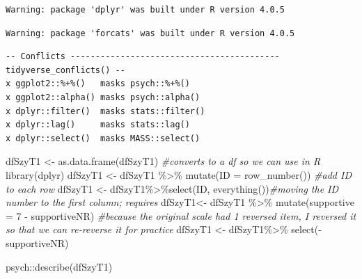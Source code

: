 \documentclass[
  english,
]{book}
\newenvironment{Shaded}{\begin{snugshade}}{\end{snugshade}}
\newcommand{\AttributeTok}[1]{\textcolor[rgb]{0.77,0.63,0.00}{#1}}
\newcommand{\CommentTok}[1]{\textcolor[rgb]{0.56,0.35,0.01}{\textit{#1}}}
\newcommand{\DecValTok}[1]{\textcolor[rgb]{0.00,0.00,0.81}{#1}}
\newcommand{\FunctionTok}[1]{\textcolor[rgb]{0.00,0.00,0.00}{#1}}
\newcommand{\NormalTok}[1]{#1}
\newcommand{\OtherTok}[1]{\textcolor[rgb]{0.56,0.35,0.01}{#1}}
\newcommand{\SpecialCharTok}[1]{\textcolor[rgb]{0.00,0.00,0.00}{#1}}
\begin{document}
\begin{verbatim}
Warning: package 'dplyr' was built under R version 4.0.5
\end{verbatim}

\begin{verbatim}
Warning: package 'forcats' was built under R version 4.0.5
\end{verbatim}

\begin{verbatim}
-- Conflicts ------------------------------------------ tidyverse_conflicts() --
x ggplot2::%+%()   masks psych::%+%()
x ggplot2::alpha() masks psych::alpha()
x dplyr::filter()  masks stats::filter()
x dplyr::lag()     masks stats::lag()
x dplyr::select()  masks MASS::select()
\end{verbatim}

\begin{Shaded}
\begin{Highlighting}[]
\NormalTok{dfSzyT1 }\OtherTok{\textless{}{-}} \FunctionTok{as.data.frame}\NormalTok{(dfSzyT1) }\CommentTok{\#converts to a df so we can use in R}
\FunctionTok{library}\NormalTok{(dplyr)}
\NormalTok{dfSzyT1 }\OtherTok{\textless{}{-}}\NormalTok{ dfSzyT1 }\SpecialCharTok{\%\textgreater{}\%} \FunctionTok{mutate}\NormalTok{(}\AttributeTok{ID =} \FunctionTok{row\_number}\NormalTok{()) }\CommentTok{\#add ID to each row}
\NormalTok{dfSzyT1 }\OtherTok{\textless{}{-}}\NormalTok{ dfSzyT1}\SpecialCharTok{\%\textgreater{}\%}\FunctionTok{select}\NormalTok{(ID, }\FunctionTok{everything}\NormalTok{())}\CommentTok{\#moving the ID number to the first column; requires}
\NormalTok{dfSzyT1}\OtherTok{\textless{}{-}}\NormalTok{ dfSzyT1 }\SpecialCharTok{\%\textgreater{}\%}
  \FunctionTok{mutate}\NormalTok{(}\AttributeTok{supportive =} \DecValTok{7} \SpecialCharTok{{-}}\NormalTok{ supportiveNR) }\CommentTok{\#because the original scale had 1 reversed item, I reversed it so that we can re{-}reverse it for practice}
\NormalTok{dfSzyT1 }\OtherTok{\textless{}{-}}\NormalTok{ dfSzyT1}\SpecialCharTok{\%\textgreater{}\%}
  \FunctionTok{select}\NormalTok{(}\SpecialCharTok{{-}}\NormalTok{supportiveNR)}
\end{Highlighting}
\end{Shaded}

\begin{Shaded}
\begin{Highlighting}[]
\NormalTok{psych}\SpecialCharTok{::}\FunctionTok{describe}\NormalTok{(dfSzyT1)}
\end{Highlighting}
\end{Shaded}
\end{document}
